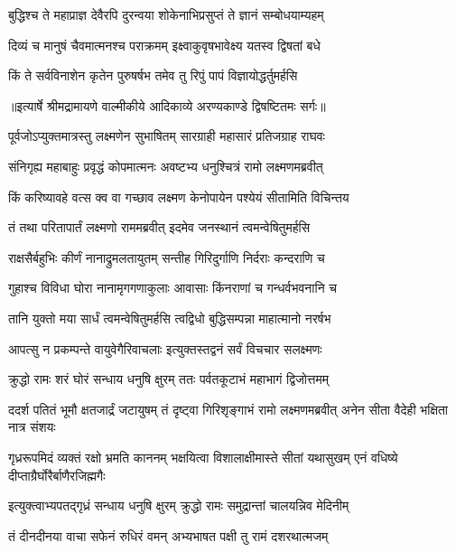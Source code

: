 \twolineshloka
{बुद्धिश्च ते महाप्राज्ञ देवैरपि दुरन्वया}
{शोकेनाभिप्रसुप्तं ते ज्ञानं सम्बोधयाम्यहम्} %

\twolineshloka
{दिव्यं च मानुषं चैवमात्मनश्च पराक्रमम्}
{इक्ष्वाकुवृषभावेक्ष्य यतस्व द्विषतां बधे} %

\twolineshloka
{किं ते सर्वविनाशेन कृतेन पुरुषर्षभ}
{तमेव तु रिपुं पापं विज्ञायोद्धर्तुमर्हसि} %


{॥इत्यार्षे श्रीमद्रामायणे वाल्मीकीये आदिकाव्ये अरण्यकाण्डे द्विषष्टितमः सर्गः॥}


\twolineshloka
{पूर्वजोऽप्युक्तमात्रस्तु लक्ष्मणेन सुभाषितम्}
{सारग्राही महासारं प्रतिजग्राह राघवः} %

\twolineshloka
{संनिगृह्य महाबाहुः प्रवृद्धं कोपमात्मनः}
{अवष्टभ्य धनुश्चित्रं रामो लक्ष्मणमब्रवीत्} %

\twolineshloka
{किं करिष्यावहे वत्स क्व वा गच्छाव लक्ष्मण}
{केनोपायेन पश्येयं सीतामिति विचिन्तय} %

\twolineshloka
{तं तथा परितापार्तं लक्ष्मणो राममब्रवीत्}
{इदमेव जनस्थानं त्वमन्वेषितुमर्हसि} %

\twolineshloka
{राक्षसैर्बहुभिः कीर्णं नानाद्रुमलतायुतम्}
{सन्तीह गिरिदुर्गाणि निर्दराः कन्दराणि च} %

\twolineshloka
{गुहाश्च विविधा घोरा नानामृगगणाकुलाः}
{आवासाः किंनराणां च गन्धर्वभवनानि च} %

\twolineshloka
{तानि युक्तो मया सार्धं त्वमन्वेषितुमर्हसि}
{त्वद्विधो बुद्धिसम्पन्ना माहात्मानो नरर्षभ} %

\twolineshloka
{आपत्सु न प्रकम्पन्ते वायुवेगैरिवाचलाः}
{इत्युक्तस्तद्वनं सर्वं विचचार सलक्ष्मणः} %

\twolineshloka
{क्रुद्धो रामः शरं घोरं सन्धाय धनुषि क्षुरम्}
{ततः पर्वतकूटाभं महाभागं द्विजोत्तमम्} %

\threelineshloka
{ददर्श पतितं भूमौ क्षतजार्द्रं जटायुषम्}
{तं दृष्ट्वा गिरिशृङ्गाभं रामो लक्ष्मणमब्रवीत्}
{अनेन सीता वैदेही भक्षिता नात्र संशयः} %

\threelineshloka
{गृध्ररूपमिदं व्यक्तं रक्षो भ्रमति काननम्}
{भक्षयित्वा विशालाक्षीमास्ते सीतां यथासुखम्}
{एनं वधिष्ये दीप्ताग्रैर्घोरैर्बाणैरजिह्मगैः} %

\twolineshloka
{इत्युक्त्वाभ्यपतद्गृध्रं सन्धाय धनुषि क्षुरम्}
{क्रुद्धो रामः समुद्रान्तां चालयन्निव मेदिनीम्} %

\twolineshloka
{तं दीनदीनया वाचा सफेनं रुधिरं वमन्}
{अभ्यभाषत पक्षी तु रामं दशरथात्मजम्} %

